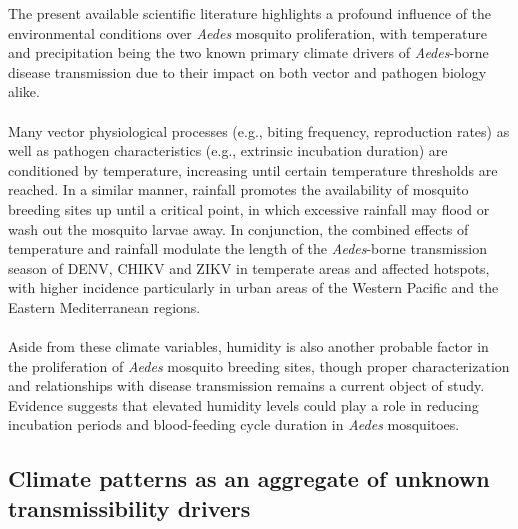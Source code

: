 \documentclass[10pt,twocolumn]{wlscirep}
\begin{document}
The present available scientific literature highlights a profound influence of the environmental conditions over \textit{Aedes} mosquito proliferation, with temperature and precipitation being the two known primary climate drivers of \textit{Aedes}-borne disease transmission due to their impact on both vector and pathogen biology alike.
\\
\\
Many vector physiological processes (e.g., biting frequency, reproduction rates) as well as pathogen characteristics (e.g., extrinsic incubation duration) are conditioned by temperature, increasing until certain temperature thresholds are reached\cite{mordecai_2019}. In a similar manner, rainfall promotes the availability of mosquito breeding sites up until a critical point, in which excessive rainfall may flood or wash out the mosquito larvae away\cite{paaijmans_2007}. In conjunction, the combined effects of temperature and rainfall modulate the length of the \textit{Aedes}-borne transmission season of DENV, CHIKV and ZIKV in temperate areas and affected hotspots, with higher incidence particularly in urban areas of the Western Pacific and the Eastern Mediterranean regions\cite{colon-gonzalez_2021}.
\\
\\
Aside from these climate variables, humidity is also another probable factor in the proliferation of \textit{Aedes} mosquito breeding sites, though proper characterization and relationships with disease transmission remains a current object of study. Evidence suggests that elevated humidity levels could play a role in reducing incubation periods and blood-feeding cycle duration in \textit{Aedes} mosquitoes\cite{descloux_2012}.

\subsection{Climate patterns as an aggregate of unknown transmissibility drivers} \label{sec-climate-patterns}
\end{document}
